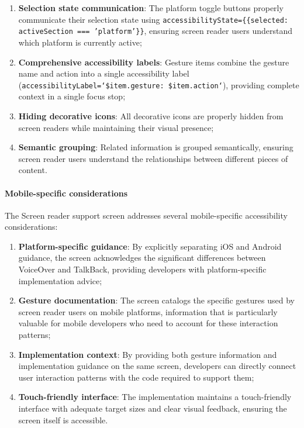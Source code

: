 \begin{enumerate}
    \item \textbf{Selection state communication}: The platform toggle buttons properly communicate their selection state using \texttt{accessibilityState=\{\{selected: activeSection === 'platform'\}\}}, ensuring screen reader users understand which platform is currently active;
    
    \item \textbf{Comprehensive accessibility labels}: Gesture items combine the gesture name and action into a single accessibility label (\texttt{accessibilityLabel=`\${item.gesture}: \${item.action}`}), providing complete context in a single focus stop;
    
    \item \textbf{Hiding decorative icons}: All decorative icons are properly hidden from screen readers while maintaining their visual presence;
    
    \item \textbf{Semantic grouping}: Related information is grouped semantically, ensuring screen reader users understand the relationships between different pieces of content.
\end{enumerate}

\paragraph{Mobile-specific considerations}

The Screen reader support screen addresses several mobile-specific accessibility considerations:

\begin{enumerate}
    \item \textbf{Platform-specific guidance}: By explicitly separating iOS and Android guidance, the screen acknowledges the significant differences between VoiceOver and TalkBack, providing developers with platform-specific implementation advice;
    
    \item \textbf{Gesture documentation}: The screen catalogs the specific gestures used by screen reader users on mobile platforms, information that is particularly valuable for mobile developers who need to account for these interaction patterns;
    
    \item \textbf{Implementation context}: By providing both gesture information and implementation guidance on the same screen, developers can directly connect user interaction patterns with the code required to support them;
    
    \item \textbf{Touch-friendly interface}: The implementation maintains a touch-friendly interface with adequate target sizes and clear visual feedback, ensuring the screen itself is accessible.
\end{enumerate}

